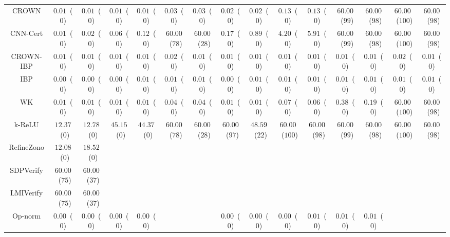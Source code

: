 \begin{table*}
{\begin{tabular}{c|c|c|c|c|c|c|c|c|c|c|c|c|c|c}
        CROWN &  $0.01$~($0$) &  $0.01$~($0$) &  $0.01$~($0$) &  $0.01$~($0$) &  $0.03$~($0$) &  $0.03$~($0$) &  $0.02$~($0$) &  $0.02$~($0$) &  $0.13$~($0$) &  $0.13$~($0$) & $60.00$~($99$) & $60.00$~($98$) & $60.00$~($100$) & $60.00$~($98$) \\
     CNN-Cert &  $0.01$~($0$) &  $0.02$~($0$) &  $0.06$~($0$) &  $0.12$~($0$) & $60.00$~($78$) & $60.00$~($28$) &  $0.17$~($0$) &  $0.89$~($0$) &  $4.20$~($0$) &  $5.91$~($0$) & $60.00$~($99$) & $60.00$~($98$) & $60.00$~($100$) & $60.00$~($98$) \\
    CROWN-IBP &  $0.01$~($0$) &  $0.01$~($0$) &  $0.01$~($0$) &  $0.01$~($0$) &  $0.02$~($0$) &  $0.01$~($0$) &  $0.01$~($0$) &  $0.01$~($0$) &  $0.01$~($0$) &  $0.01$~($0$) &  $0.01$~($0$) &  $0.01$~($0$) &  $0.02$~($0$) &  $0.01$~($0$) \\
          IBP &  $0.00$~($0$) &  $0.00$~($0$) &  $0.00$~($0$) &  $0.01$~($0$) &  $0.01$~($0$) &  $0.01$~($0$) &  $0.00$~($0$) &  $0.01$~($0$) &  $0.01$~($0$) &  $0.01$~($0$) &  $0.01$~($0$) &  $0.01$~($0$) &  $0.01$~($0$) &  $0.01$~($0$) \\
           WK &  $0.01$~($0$) &  $0.01$~($0$) &  $0.01$~($0$) &  $0.01$~($0$) &  $0.04$~($0$) &  $0.04$~($0$) &  $0.01$~($0$) &  $0.01$~($0$) &  $0.07$~($0$) &  $0.06$~($0$) &  $0.38$~($0$) &  $0.19$~($0$) & $60.00$~($100$) & $60.00$~($98$) \\
       k-ReLU & $12.37$~($0$) & $12.78$~($0$) & $45.15$~($0$) & $44.37$~($0$) & $60.00$~($78$) & $60.00$~($28$) & $60.00$~($97$) & $48.59$~($22$) & $60.00$~($100$) & $60.00$~($98$) & $60.00$~($99$) & $60.00$~($98$) & $60.00$~($100$) & $60.00$~($98$) \\
   RefineZono & $12.08$~($0$) & $18.52$~($0$) &               &               &               &               &               &               &               &               &               &               &               &               \\
    SDPVerify & $60.00$~($75$) & $60.00$~($37$) &               &               &               &               &               &               &               &               &               &               &               &               \\
    LMIVerify & $60.00$~($75$) & $60.00$~($37$) &               &               &               &               &               &               &               &               &               &               &               &               \\
      Op-norm &  $0.00$~($0$) &  $0.00$~($0$) &  $0.00$~($0$) &  $0.00$~($0$) &               &               &  $0.00$~($0$) &  $0.00$~($0$) &  $0.00$~($0$) &  $0.01$~($0$) &  $0.01$~($0$) &  $0.01$~($0$) &               &               \\

\end{tabular}}
\end{table*}
